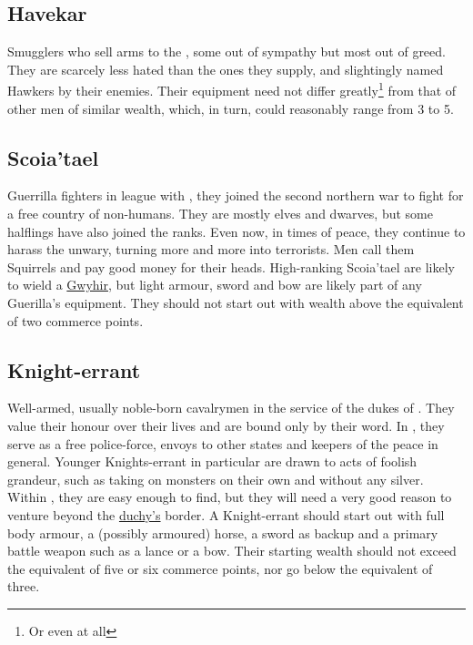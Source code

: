 \documentclass[parskip=full,11pt,%
footheight=38pt]{scrreport}
\begin{document}
\subsection{Havekar}
Smugglers who sell arms to the , some out of sympathy but most out of greed. They are scarcely less hated than the ones they supply,
and slightingly named Hawkers by their enemies. Their equipment need not differ greatly\footnote{Or even at all} from that of other men of similar
wealth, which, in turn, could reasonably range from 3 to 5.

\subsection{Scoia'tael}\label{profession:scoiatael}
Guerrilla fighters in league with , they joined the second northern war to fight for a free country of non-humans.
They are mostly elves and dwarves, but some halflings have also joined the ranks. Even now, in times of peace, they continue to harass the
unwary, turning more and more into terrorists. Men call them Squirrels and pay good money for their heads. High-ranking Scoia'tael are
likely to wield a \hyperref[weapon:gwyhir]{Gwyhir}, but light armour, sword and bow are likely part of any Guerilla's equipment.
They should not start out with wealth above the equivalent of two commerce points.

\subsection{Knight-errant}\label{profession:knight_errant}
Well-armed, usually noble-born cavalrymen in the service of the dukes of . They value their honour over their lives and are
bound only by their word. In , they serve as a free police-force, envoys to other states and keepers of the peace in general.
Younger Knights-errant in particular are drawn to acts of foolish grandeur, such as taking on monsters on their own and without any silver. Within
, they are easy enough to find, but they will need a very good reason to venture beyond the \hyperref[realm:toussaint]{duchy's} border.
A Knight-errant should start out with full body armour, a (possibly armoured) horse, a sword as backup and a primary battle weapon such as a lance or
a bow. Their starting wealth should not exceed the equivalent of five or six commerce points, nor go below the equivalent of three.
\end{document}
